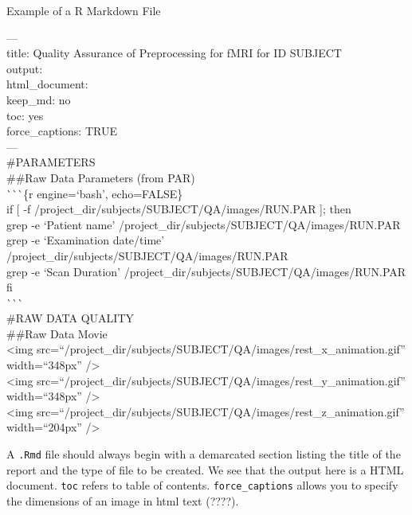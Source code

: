 \begin{bash}{Example of a R Markdown File}{}

--- \\
title: Quality Assurance of Preprocessing for fMRI for ID SUBJECT \\
output: \\
  html_document: \\
    keep_md: no \\
    toc: yes \\
    force_captions: TRUE \\
--- \\

\#PARAMETERS \\

\#\#Raw Data Parameters (from PAR) \\

\`{}\`{}\`{}\{r engine=`bash', echo=FALSE\} \\
if [ -f /project_dir/subjects/SUBJECT/QA/images/RUN.PAR ]; then \\
  grep -e `Patient name' /project_dir/subjects/SUBJECT/QA/images/RUN.PAR \\
  grep -e `Examination date/time' /project_dir/subjects/SUBJECT/QA/images/RUN.PAR \\
  grep -e `Scan Duration' /project_dir/subjects/SUBJECT/QA/images/RUN.PAR \\
fi \\
\`{}\`{}\`{} \\

\#RAW DATA QUALITY \\

\#\#Raw Data Movie \\

<img src=``/project_dir/subjects/SUBJECT/QA/images/rest_x_animation.gif'' width=``348px'' /> \\
<img src=``/project_dir/subjects/SUBJECT/QA/images/rest_y_animation.gif'' width=``348px'' /> \\
<img src=``/project_dir/subjects/SUBJECT/QA/images/rest_z_animation.gif'' width=``204px'' /> \\
\end{bash}

A \texttt{.Rmd} file should always begin with a demarcated section listing the title of the report and the type of file to be created. We see that the output here is a HTML document. \texttt{toc} refers to table of contents. \texttt{force_captions} allows you to specify the dimensions of an image in html text (????). %

